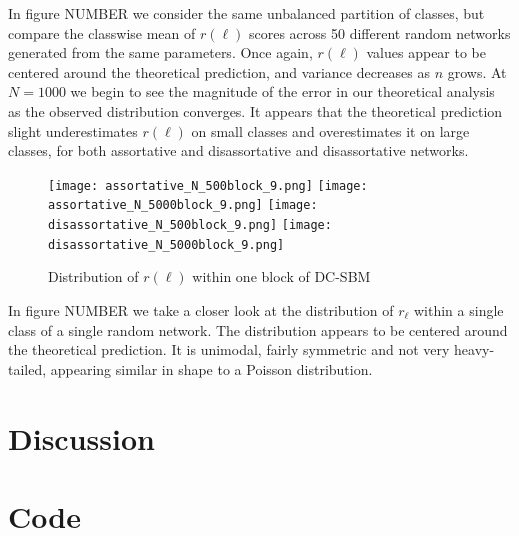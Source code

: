 \documentclass[12pt]{article}
\begin{document}
In figure NUMBER we consider the same unbalanced partition of classes, but compare the classwise mean of $r(\ell)$ scores across 50 different random networks generated from the same parameters.  Once again, $r(\ell)$ values appear to be centered around the theoretical prediction, and variance decreases as $n$ grows.  At $N=1000$ we begin to see the magnitude of the error in our theoretical analysis as the observed distribution converges.  It appears that the theoretical prediction slight underestimates $r(\ell)$ on small classes and overestimates it on large classes, for both assortative and disassortative and disassortative networks.

\begin{figure}[h!]
\texttt{[image: assortative\_N\_500block\_9.png]}
\texttt{[image: assortative\_N\_5000block\_9.png]}
\texttt{[image: disassortative\_N\_500block\_9.png]}
\texttt{[image: disassortative\_N\_5000block\_9.png]}
\caption{Distribution of $r(\ell)$ within one block of DC-SBM}
\end{figure}

In figure NUMBER we take a closer look at the distribution of $r_\ell$ within a single class of a single random network.  The distribution appears to be centered around the theoretical prediction.  It is unimodal, fairly symmetric and not very heavy-tailed, appearing similar in shape to a Poisson distribution.

\section{Discussion}


\section*{Code}
\end{document}
